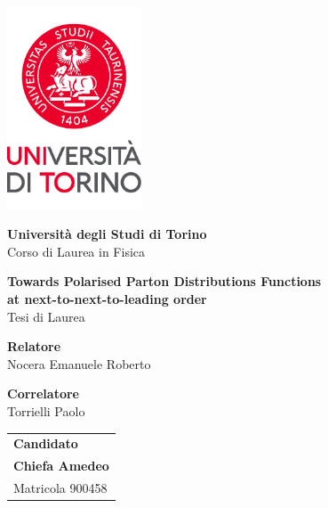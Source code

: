 \begin{titlepage}
  \centering
  \vspace*{0.5cm}

  \includegraphics[width=0.3\textwidth]{./images/newlogo.pdf}

  \vspace{1.5cm}

  \LARGE
  \textbf{Università degli Studi di Torino}\\

  \vspace{1mm}
  Corso di Laurea in Fisica
        
  \vspace{2cm}

  \textbf{Towards Polarised Parton Distributions Functions}\\
  \textbf{at next-to-next-to-leading order}\\
  Tesi di Laurea\\

  \vfill

  \raggedright

  \large

  \textbf{Relatore}\\
  Nocera Emanuele Roberto\\

  \vspace{10mm}

  \textbf{Correlatore}\\
  Torrielli Paolo\\

  \vspace{5mm}

  \begin{flushright}
    \begin{tabular}{@{}l@{}}
      \textbf{Candidato}\\
      \textbf{Chiefa Amedeo}\\
      Matricola 900458
      \end{tabular}
  \end{flushright}


\end{titlepage}